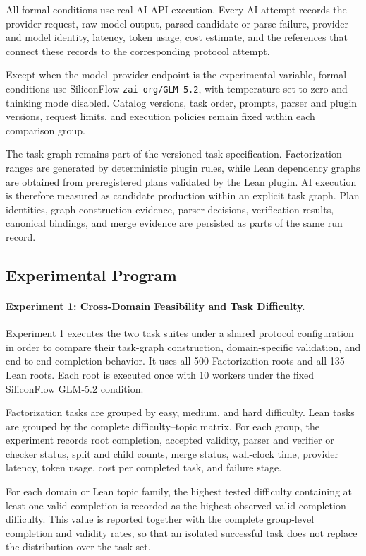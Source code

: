 \documentclass{article}
\theoremstyle{plain}
\begin{document}
All formal conditions use real AI API execution. Every AI attempt records
the provider request, raw model output, parsed candidate or parse failure,
provider and model identity, latency, token usage, cost estimate, and the
references that connect these records to the corresponding protocol
attempt.

Except when the model--provider endpoint is the experimental variable,
formal conditions use SiliconFlow \texttt{zai-org/GLM-5.2}, with
temperature set to zero and thinking mode disabled. Catalog versions,
task order, prompts, parser and plugin versions, request limits, and
execution policies remain fixed within each comparison group.

The task graph remains part of the versioned task specification.
Factorization ranges are generated by deterministic plugin rules, while
Lean dependency graphs are obtained from preregistered plans validated by
the Lean plugin. AI execution is therefore measured as candidate production
within an explicit task graph. Plan identities, graph-construction
evidence, parser decisions, verification results, canonical bindings, and
merge evidence are persisted as parts of the same run record.


\subsection{Experimental Program}

\paragraph{Experiment 1: Cross-Domain Feasibility and Task Difficulty.}

Experiment 1 executes the two task suites under a shared protocol
configuration in order to compare their task-graph construction,
domain-specific validation, and end-to-end completion behavior. It uses
all 500 Factorization roots and all 135 Lean roots. Each root is executed
once with 10 workers under the fixed SiliconFlow GLM-5.2 condition.

Factorization tasks are grouped by easy, medium, and hard difficulty.
Lean tasks are grouped by the complete difficulty--topic matrix. For each
group, the experiment records root completion, accepted validity, parser
and verifier or checker status, split and child counts, merge status,
wall-clock time, provider latency, token usage, cost per completed task,
and failure stage.

For each domain or Lean topic family, the highest tested difficulty
containing at least one valid completion is recorded as the highest
observed valid-completion difficulty. This value is reported together with
the complete group-level completion and validity rates, so that an isolated
successful task does not replace the distribution over the task set.
\end{document}
